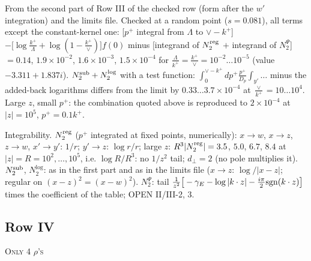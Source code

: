 \documentclass[9pt]{article}
\numberwithin{equation}{section}
\begin{document}
{\color{gray}\small From the second part of Row III of the checked row (form after the $w'$ integration) and the limits file. Checked at a random point ($s=0.081$), all terms except the constant-kernel one: [$p^{+}$ integral from $\Lambda$ to $\vee-k^{+}$] $-\big[\log\frac{k^{+}}{\Lambda}+\log(1-\frac{k^{+}}{\vee})\big]f(0)$ minus [integrand of $N_{2}^{\rm reg}$ $+$ integrand of $N_{2}^{\Psi}$] $=0.14$, $1.9\times10^{-2}$, $1.6\times10^{-3}$, $1.5\times10^{-4}$ for $\frac{\Lambda}{k^{+}}=\frac{k^{+}}{\vee}=10^{-2}\dots10^{-5}$ (value $-3.311+1.837i$). $N_{2}^{\rm sub}+N_{2}^{\log}$ with a test function: $\int_{0}^{\vee-k^{+}}dp^{+}\frac{p^{+}}{D_{p}}\int_{y'}\dots$ minus the added-back logarithms differs from the limit by $0.33\dots3.7\times10^{-4}$ at $\frac{\vee}{k^{+}}=10\dots10^{4}$. Large $z$, small $p^{+}$: the combination quoted above is reproduced to $2\times10^{-4}$ at $|z|=10^{5}$, $p^{+}=0.1k^{+}$.}\par
\noindent Integrability. $N_{2}^{\rm reg}$ ($p^{+}$ integrated at fixed points, numerically): $x\to w$, $x\to z$, $z\to w$, $x'\to y'$: $1/r$; $y'\to z$: $\log r/r$; large $z$: $R^{3}|N_{2}^{\rm reg}|=3.5$, $5.0$, $6.7$, $8.4$ at $|z|=R=10^{2},\dots,10^{5}$, i.e. $\log R/R^{3}$: no $1/z^{2}$ tail; $d_{\perp}=2$ (no pole multiplies it). $N_{2}^{\rm sub}$, $N_{2}^{\log}$: as in the first part and as in the limits file ($x\to z$: $\log/|x-z|$; regular on $(x-z)^{2}=(x-w)^{2}$). $N_{2}^{\Psi}$: {\color{magenta}tail $\frac{1}{z^{2}}\big[-\gamma_{E}-\log|k\cdot z|-\frac{i\pi}{2}{\rm sgn}(k\cdot z)\big]$ times the coefficient of the table; OPEN II/III-2, 3.}
\subsection{Row IV}
\textsc{Only 4 $\rho$'s}
\end{document}
